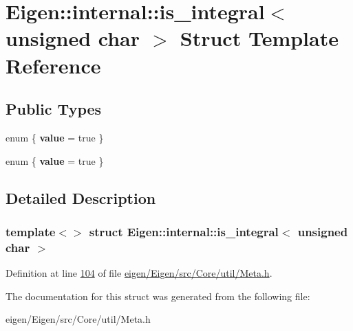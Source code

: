 \hypertarget{struct_eigen_1_1internal_1_1is__integral_3_01unsigned_01char_01_4}{}\section{Eigen\+:\+:internal\+:\+:is\+\_\+integral$<$ unsigned char $>$ Struct Template Reference}
\label{struct_eigen_1_1internal_1_1is__integral_3_01unsigned_01char_01_4}
\subsection*{Public Types}
\begin{DoxyCompactItemize}
\item 
\mbox{\label{struct_eigen_1_1internal_1_1is__integral_3_01unsigned_01char_01_4_a3354f7525f567889daa16ec6321b4671}} 
enum \{ {\bfseries value} = true
 \}
\item 
\mbox{\label{struct_eigen_1_1internal_1_1is__integral_3_01unsigned_01char_01_4_af3d933e6f0f0f6954045ec693474cd06}} 
enum \{ {\bfseries value} = true
 \}
\end{DoxyCompactItemize}


\subsection{Detailed Description}
\subsubsection*{template$<$$>$\newline
struct Eigen\+::internal\+::is\+\_\+integral$<$ unsigned char $>$}



Definition at line \hyperlink{eigen_2_eigen_2src_2_core_2util_2_meta_8h_source_l00104}{104} of file \hyperlink{eigen_2_eigen_2src_2_core_2util_2_meta_8h_source}{eigen/\+Eigen/src/\+Core/util/\+Meta.\+h}.



The documentation for this struct was generated from the following file\+:\begin{DoxyCompactItemize}
\item 
eigen/\+Eigen/src/\+Core/util/\+Meta.\+h\end{DoxyCompactItemize}
